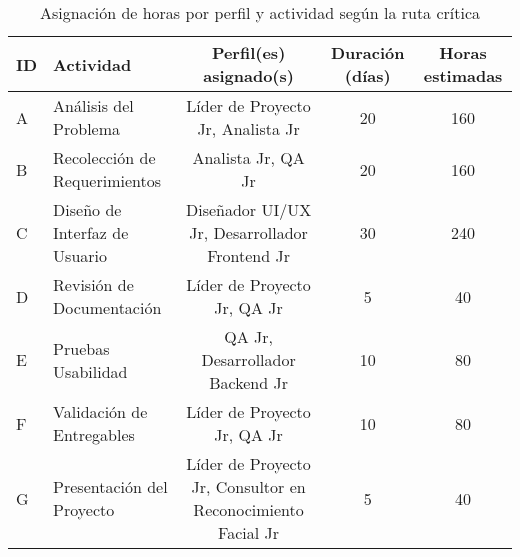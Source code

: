 
\begin{table}[h!]
\centering
\footnotesize
\begin{tabular}{|l|l|c|c|c|}
\hline
\textbf{ID} & \textbf{Actividad} & \textbf{Perfil(es) asignado(s)} & \textbf{Duración (días)} & \textbf{Horas estimadas} \\
\hline
A & Análisis del Problema & Líder de Proyecto Jr, Analista Jr & 20 & 160 \\
B & Recolección de Requerimientos & Analista Jr, QA Jr & 20 & 160 \\
C & Diseño de Interfaz de Usuario & Diseñador UI/UX Jr, Desarrollador Frontend Jr & 30 & 240 \\
D & Revisión de Documentación & Líder de Proyecto Jr, QA Jr & 5 & 40 \\
E & Pruebas Usabilidad & QA Jr, Desarrollador Backend Jr & 10 & 80 \\
F & Validación de Entregables & Líder de Proyecto Jr, QA Jr & 10 & 80 \\
G & Presentación del Proyecto & Líder de Proyecto Jr, Consultor en Reconocimiento Facial Jr & 5 & 40 \\
\hline
\end{tabular}
\caption{Asignación de horas por perfil y actividad según la ruta crítica}
\end{table}


